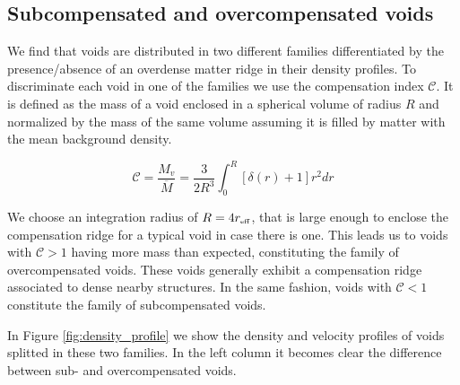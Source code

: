 \documentclass[a4,useAMS,usenatbib,usegraphicx]{mn2e}
\newcommand{\eq}[2]{\begin{equation} \label{eq:#1} #2 \end{equation}}
\newcommand{\reff}{{\ifmmode{r_{\mbox{\tiny eff}}}\else{$r_{\mbox{\tiny eff}}$}\fi}}
\begin{document}
\subsection{Subcompensated and overcompensated voids}
\label{subsec:enclosedmass}

We find that voids are distributed in two different  families
differentiated by the 
presence/absence of an overdense matter ridge in their density
profiles. 
To discriminate each void in one of the families we use the
compensation  index $\mathcal{C}$.
It is defined as the mass of a void enclosed in a spherical volume of
radius $R$ and normalized by the mass of the same volume assuming
it is filled by matter with the mean background density.

\eq{compensation}
{\mathcal{C} = \frac{M_v}{\overline{M}} = \frac{3}{2R^{3}} \int_0^{R} [\delta(r) + 1] r^2 dr}

We choose an integration radius of $R=4\reff$, that is large enough to 
enclose the compensation ridge for a typical void in case there is one. 
This leads us to voids with $\mathcal{C}>1$ having more mass than expected, 
constituting the family of overcompensated voids. 
These voids generally  exhibit a compensation ridge associated to
dense nearby structures. 
In the same fashion, voids with $\mathcal{C}<1$ constitute the family
of  subcompensated voids. 

In Figure \ref{fig:density_profile} we show the density and velocity profiles
of voids splitted in these two families. 
In the left column it becomes clear the difference between sub- and
overcompensated voids.
\end{document}
